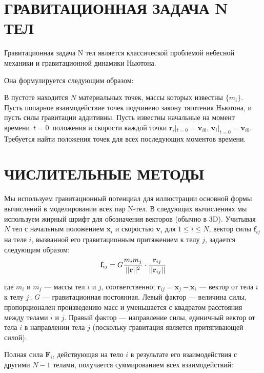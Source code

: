 \documentclass{article}
\begin{document}
\tableofcontents
\pagebreak


\pagebreak
\section{ГРАВИТАЦИОННАЯ ЗАДАЧА N ТЕЛ}

Гравитационная задача N тел является классической проблемой небесной механики и гравитационной динамики Ньютона.

Она формулируется следующим образом:

В пустоте находится $N$ материальных точек, массы которых известны $\{m_i\}$. Пусть попарное взаимодействие точек подчинено закону тяготения Ньютона, и пусть силы гравитации аддитивны. Пусть известны начальные на момент времени $\,t=0\,$ положения и скорости каждой точки $\mathbf{r}_i|_{t=0} = \mathbf{v}_{i0},\, \mathbf{v}_i|_{t=0} = \mathbf{v}_{i0}.$ Требуется найти положения точек для всех последующих моментов времени.

\pagebreak
\section{ЧИСЛИТЕЛЬНЫЕ МЕТОДЫ}

Мы используем гравитационный потенциал для иллюстрации основной формы вычислений в моделировании всех пар N-тел. В следующих вычислениях мы используем жирный шрифт для обозначения векторов (обычно в 3D). Учитывая $N$ тел с начальным положением $\mathbf{x}_i$ и скоростью $\mathbf{v}_i$ для $ 1 \leqslant i \leqslant N$, вектор силы $\mathbf{f}_{ij}$ на теле $i$, вызванной его гравитационным притяжением к телу $j$, задается следующим образом:\\
$$
\mathbf{f}_{ij} = G\frac{m_im_j}{||\mathbf{r}||^2}\cdot\frac{\mathbf{r}_{ij}}{||\mathbf{r}_{ij}||}\\[\baselineskip]
$$

где $m_i$ и $m_j$ $\text{---}$ массы тел $i$ и $j$, соответственно; $\mathbf{r}_{ij} = \mathbf{x}_j - \mathbf{x}_i$ $\text{---}$ вектор от тела $i$ к телу $j\,$; $G$ $\text{---}$ гравитационная постоянная. Левый фактор --- величина силы, пропорционален произведению масс и уменьшается с квадратом расстояния между телами $i$ и $j$. Правый фактор $\text{---}$ направление силы, единичный вектор от тела $i$ в направлении тела $j$ (поскольку гравитация является притягивающей силой).

Полная сила $\mathbf{F}_i$, действующая на тело $i$ в результате его взаимодействия с другими $N - 1$ телами, получается суммированием всех взаимодействий:
\end{document}

